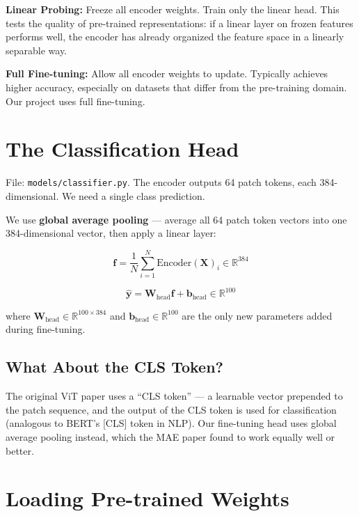 \documentclass[12pt, a4paper]{report}
\newcommand{\R}{\mathbb{R}}
\newcommand{\mat}[1]{\mathbf{#1}}
\newcommand{\vect}[1]{\bm{#1}}
\begin{document}
\begin{conceptbox}
\textbf{Linear Probing:} Freeze all encoder weights. Train only the linear head. This tests the quality of pre-trained representations: if a linear layer on frozen features performs well, the encoder has already organized the feature space in a linearly separable way.

\textbf{Full Fine-tuning:} Allow all encoder weights to update. Typically achieves higher accuracy, especially on datasets that differ from the pre-training domain. Our project uses full fine-tuning.
\end{conceptbox}

\section{The Classification Head}

File: \texttt{models/classifier.py}. The encoder outputs 64 patch tokens, each 384-dimensional. We need a single class prediction.

We use \textbf{global average pooling} — average all 64 patch token vectors into one 384-dimensional vector, then apply a linear layer:

\begin{equation}
\vect{f} = \frac{1}{N}\sum_{i=1}^{N} \text{Encoder}(\mat{X})_i \in \R^{384}
\end{equation}

\begin{equation}
\hat{\vect{y}} = \mat{W}_{\text{head}} \vect{f} + \vect{b}_{\text{head}} \in \R^{100}
\end{equation}

where $\mat{W}_{\text{head}} \in \R^{100 \times 384}$ and $\vect{b}_{\text{head}} \in \R^{100}$ are the only new parameters added during fine-tuning.

\subsection{What About the CLS Token?}

The original ViT paper uses a ``CLS token'' — a learnable vector prepended to the patch sequence, and the output of the CLS token is used for classification (analogous to BERT's [CLS] token in NLP). Our fine-tuning head uses global average pooling instead, which the MAE paper found to work equally well or better.

\section{Loading Pre-trained Weights}
\end{document}
